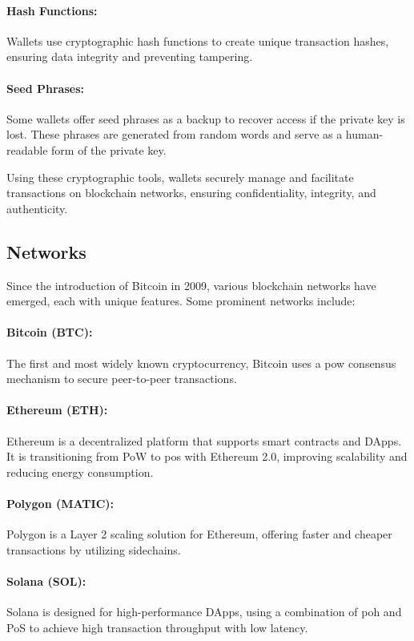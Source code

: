 \paragraph{Hash Functions:}
Wallets use cryptographic hash functions to create unique transaction hashes,
ensuring data integrity and preventing tampering.

\paragraph{Seed Phrases:}
Some wallets offer seed phrases as a backup to recover access if the private
key is lost. These phrases are generated from random words and serve as a
human-readable form of the private key.

Using these cryptographic tools, wallets securely manage and facilitate
transactions on blockchain networks, ensuring confidentiality, integrity, and
authenticity.

\subsection{Networks}\label{subsec:networks}

Since the introduction of Bitcoin in 2009, various blockchain networks have
emerged, each with unique features. Some prominent networks include:

\paragraph{Bitcoin (BTC):}
The first and most widely known cryptocurrency, Bitcoin uses a \gls{pow}
consensus mechanism to secure peer-to-peer transactions.

\paragraph{Ethereum (ETH):}
Ethereum is a decentralized platform that supports smart contracts and DApps.
It is transitioning from PoW to \gls{pos} with Ethereum 2.0, improving
scalability and reducing energy consumption.

\paragraph{Polygon (MATIC):}
Polygon is a Layer 2 scaling solution for Ethereum, offering faster and cheaper
transactions by utilizing sidechains.

\paragraph{Solana (SOL):}
Solana is designed for high-performance DApps, using a combination of \gls{poh}
and PoS to achieve high transaction throughput with low latency.

